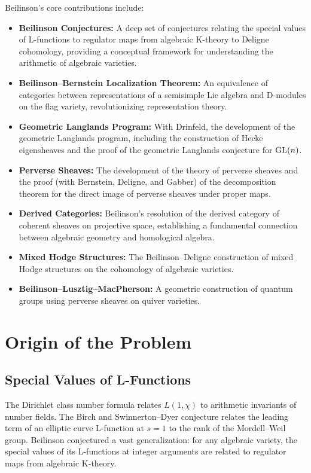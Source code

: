 Beilinson's core contributions include:
\begin{itemize}
    \item \textbf{Beilinson Conjectures:} A deep set of conjectures relating the special values of L-functions to regulator maps from algebraic K-theory to Deligne cohomology, providing a conceptual framework for understanding the arithmetic of algebraic varieties.
    \item \textbf{Beilinson--Bernstein Localization Theorem:} An equivalence of categories between representations of a semisimple Lie algebra and D-modules on the flag variety, revolutionizing representation theory.
    \item \textbf{Geometric Langlands Program:} With Drinfeld, the development of the geometric Langlands program, including the construction of Hecke eigensheaves and the proof of the geometric Langlands conjecture for $\operatorname{GL}(n)$.
    \item \textbf{Perverse Sheaves:} The development of the theory of perverse sheaves and the proof (with Bernstein, Deligne, and Gabber) of the decomposition theorem for the direct image of perverse sheaves under proper maps.
    \item \textbf{Derived Categories:} Beilinson's resolution of the derived category of coherent sheaves on projective space, establishing a fundamental connection between algebraic geometry and homological algebra.
    \item \textbf{Mixed Hodge Structures:} The Beilinson--Deligne construction of mixed Hodge structures on the cohomology of algebraic varieties.
    \item \textbf{Beilinson--Lusztig--MacPherson:} A geometric construction of quantum groups using perverse sheaves on quiver varieties.
\end{itemize}

\section{Origin of the Problem}

\subsection{Special Values of L-Functions}

The Dirichlet class number formula relates $L(1, \chi)$ to arithmetic invariants of number fields. The Birch and Swinnerton--Dyer conjecture relates the leading term of an elliptic curve L-function at $s = 1$ to the rank of the Mordell--Weil group. Beilinson conjectured a vast generalization: for any algebraic variety, the special values of its L-functions at integer arguments are related to regulator maps from algebraic K-theory.

